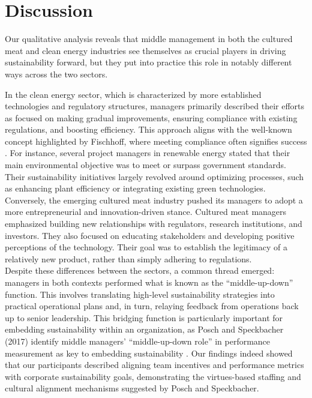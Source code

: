 
	
	\section{Discussion}
	
	Our qualitative analysis reveals that middle management in both the cultured meat and clean energy industries see themselves as crucial players in driving sustainability forward, but they put into practice this role in notably different ways across the two sectors.
	
	In the clean energy sector, which is characterized by more established technologies and regulatory structures, managers primarily described their efforts as focused on making gradual improvements, ensuring compliance with existing regulations, and boosting efficiency. This approach aligns with the well-known concept highlighted by Fischhoff, where meeting compliance often signifies success \cite{Fischhoff2024}. For instance, several project managers in renewable energy stated that their main environmental objective was to meet or surpass government standards. Their sustainability initiatives largely revolved around optimizing processes, such as enhancing plant efficiency or integrating existing green technologies. \\
	
	Conversely, the emerging cultured meat industry pushed its managers to adopt a more entrepreneurial and innovation-driven stance. Cultured meat managers emphasized building new relationships with regulators, research institutions, and investors. They also focused on educating stakeholders and developing positive perceptions of the technology. Their goal was to establish the legitimacy of a relatively new product, rather than simply adhering to regulations. \\
	
	Despite these differences between the sectors, a common thread emerged: managers in both contexts performed what is known as the ``middle-up-down'' function. This involves translating high-level sustainability strategies into practical operational plans and, in turn, relaying feedback from operations back up to senior leadership. This bridging function is particularly important for embedding sustainability within an organization, as Posch and Speckbacher (2017) identify middle managers’ ``middle-up-down role'' in performance measurement as key to embedding sustainability \cite{Posch2017}. Our findings indeed showed that our participants described aligning team incentives and performance metrics with corporate sustainability goals, demonstrating the virtues-based staffing and cultural alignment mechanisms suggested by Posch and Speckbacher. \\
	
